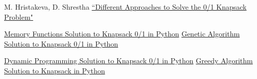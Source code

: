 \documentclass[a4paper, 11pt]{article}
\begin{document}
\newpage
\begin{thebibliography}{99}


M. Hristakeva, D. Shrestha \href{http://www.micsymposium.org/mics_2005/papers/paper102.pdf}{``Different Approaches to Solve the 0/1 Knapsack Problem"} 

\href{https://github.com/TheAlgorithms/Python/blob/master/dynamic_programming/knapsack.py}{Memory Functions Solution to Knapsack 0/1 in Python} 
\href{https://github.com/edmilsonrobson/0-1-Knapsack-Problem-with-Genetic-Algorithms}{Genetic Algorithm Solution to Knapsack 0/1 in Python} 

\href{https://rosettacode.org/wiki/Knapsack_problem/0-1#Python}{Dynamic Programming Solution to Knapsack 0/1 in Python}
\href{https://www.sanfoundry.com/python-program-solve-fractional-knapsack-problem-using-greedy-algorithm/}{Greedy Algorithm Solution to Knapsack in Python}

\end{thebibliography}
\end{document}
